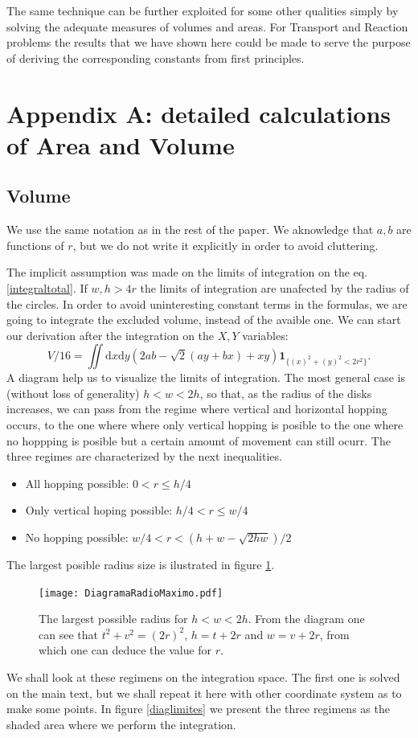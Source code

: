 \documentclass[letterpaper,10pt, jcp, aps]{revtex4-1}
\newcommand{\rd}{\!\mathrm{d}}
\newcommand{\indicator}[1]{\mathbf{1}_{ \{   #1 \} } }
\begin{document}
The same technique can be further exploited for some other
qualities simply by solving the adequate measures
of volumes and areas. For Transport and Reaction problems
the results that we have shown here could be made to serve
the purpose of deriving the corresponding constants from first
principles.


\section{Appendix A: detailed calculations of Area and Volume}

\subsection{Volume}\label{VolApen}

We use the same notation as in the rest of the paper.
We aknowledge that $a,b$ are functions of $r$, but we do not write
it explicitly in order to avoid cluttering.

The implicit assumption was made on the limits of integration on
the eq. \ref{integraltotal}. If $w,h>4r$ the limits of integration
are unafected by the radius of the circles.
In order to avoid uninteresting constant terms
in the formulas, we are going to integrate
the excluded volume, instead of the avaible one. We can start
our derivation after the integration on the $X,Y$ variables:
\begin{equation}\label{VolumenGeneral}
V/16 =\iint \rd x \rd y (2ab-\sqrt{2}(ay+bx)+x y)
\indicator{(x)^2+(y)^2<2r^2 }.
\end{equation}
A diagram help us to visualize the limits of integration. The most general
case is (without loss of generality) $h<w<2h$, so that, as the radius of the
disks increases, we can pass from the regime where vertical and horizontal
hopping occurs, to the one where where only vertical hopping
is posible to the one where no hoppping is posible but a certain amount of movement
can still ocurr. The three regimes are characterized by the next inequalities.
\begin{itemize}
\item All hopping possible: $0<r \leq h/4$
\item Only vertical hoping possible: $h/4< r \leq w/4$
\item No hopping possible: $w/4<r<(h+w-\sqrt{2hw})/2$
\end{itemize}
The largest posible radius size  is ilustrated in figure \ref{radiomaximo}.
\begin{figure}[h]
  \centering
  \texttt{[image: DiagramaRadioMaximo.pdf]}
  \caption{The largest possible radius for $h<w<2h$. From the diagram
    one can see that $t^2+v^2=(2r)^2$, $h=t+2r$ and $w=v+2r$, from which
    one can deduce the value for $r$.}
  \label{radiomaximo}
\end{figure}
We shall look at these regimens on the integration space. The first one is solved
on the main text, but we shall repeat it here with other coordinate system as to
make some points. In figure \ref{diaglimites} we present the three regimens as
the shaded area where we perform the integration. 
  
\end{document}
